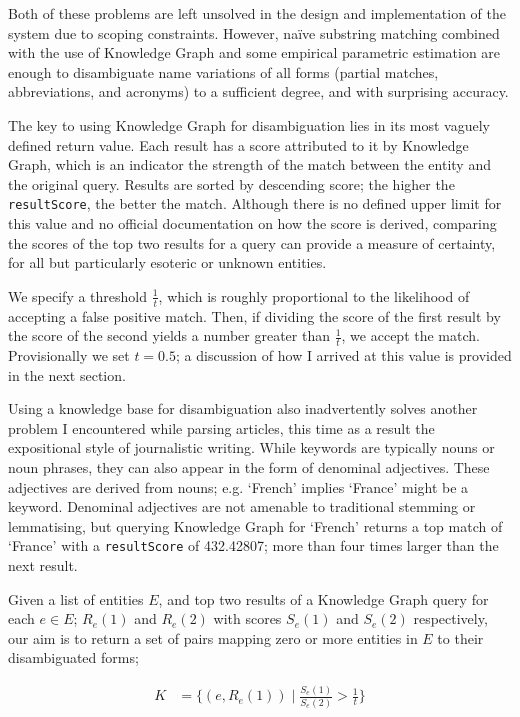Both of these problems are left unsolved in the design and implementation of the system due to scoping constraints. However, naïve substring matching combined with the use of Knowledge Graph and some empirical parametric estimation are enough to disambiguate name variations of all forms (partial matches, abbreviations, and acronyms) to a sufficient degree, and with surprising accuracy.

The key to using Knowledge Graph for disambiguation lies in its most vaguely defined return value. Each result has a score attributed to it by Knowledge Graph, which is an indicator the strength of the match between the entity and the original query. Results are sorted by descending score; the higher the \texttt{resultScore}, the better the match. Although there is no defined upper limit for this value and no official documentation on how the score is derived, comparing the scores of the top two results for a query can provide a measure of certainty, for all but particularly esoteric or unknown entities.

We specify a threshold $\frac{1}{t}$, which is roughly proportional to the likelihood of accepting a false positive match. Then, if dividing the score of the first result by the score of the second yields a number greater than $\frac{1}{t}$, we accept the match. Provisionally we set $t=0.5$; a discussion of how I arrived at this value is provided in the next section.

Using a knowledge base for disambiguation also inadvertently solves another problem I encountered while parsing articles, this time as a result the expositional style of journalistic writing. While keywords are typically nouns or noun phrases, they can also appear in the form of denominal adjectives. These adjectives are derived from nouns; e.g. `French' implies `France' might be a keyword. Denominal adjectives are not amenable to traditional stemming or lemmatising, but querying Knowledge Graph for `French' returns a top match of `France' with a \texttt{resultScore} of 432.42807; more than four times larger than the next result.

Given a list of entities $E$, and top two results of a Knowledge Graph query for each $e \in E$; $R_e(1)$ and $R_e(2)$ with scores $S_e(1)$ and $S_e(2)$ respectively, our aim is to return a set of pairs mapping zero or more entities in $E$ to their disambiguated forms;

\begin{align*}
K &= \bigg\{(e, R_e(1))\;|\;\frac{S_e(1)}{S_e(2)} > \frac{1}{t}\bigg\}
\end{align*}

